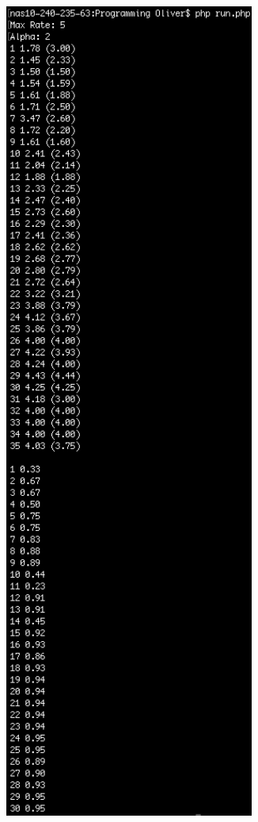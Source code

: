 \documentclass{article}
\begin{document}
\begin{figure}[htp]\ContinuedFloat
\begin{subfigure}{0.45\textwidth}
\centering
\includegraphics[width=0.9\textwidth]{Screenshots/Alpha2}

\end{subfigure}
\end{figure}
\end{document}
